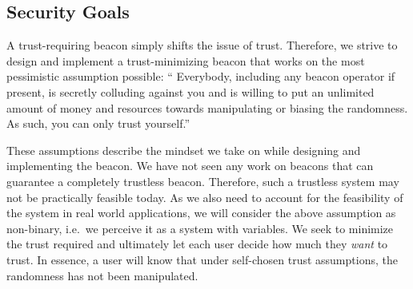 \subsection{Security Goals}\label{sec:security_goals}
A trust-requiring beacon simply shifts the issue of trust.
Therefore, we strive to design and implement a trust-minimizing beacon that works on the most pessimistic assumption possible:
\enquote{%
Everybody,
 including any beacon operator if present, is secretly colluding against you and is willing to put an unlimited amount of money and resources towards manipulating or biasing the randomness.
As such, you can only trust yourself.}

These assumptions describe the mindset we take on while designing and implementing the beacon.
We have not seen any work on beacons that can guarantee a completely trustless beacon. Therefore, such a trustless system may not be practically feasible today.
As we also need to account for the feasibility of the system in real world applications, we will consider the above assumption as non-binary, i.e.\ we perceive it as a system with variables.
We seek to minimize the trust required and ultimately let each user decide how much they \emph{want} to trust.
In essence, a user will know that under self-chosen trust assumptions, the randomness has not been manipulated.
